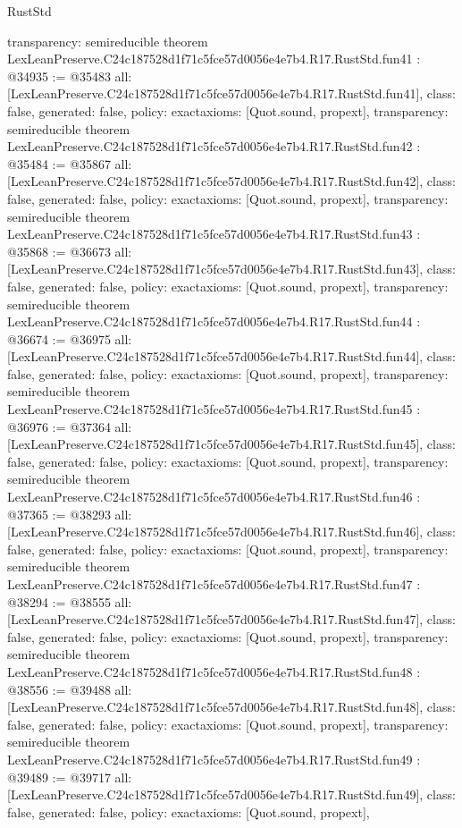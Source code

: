 \begin{lexlean}{RustStd}
\begin{coremodule}
{  transparency: semireducible
}
theorem LexLeanPreserve.C24c187528d1f71c5fce57d0056e4e7b4.R17.RustStd.fun41 : @34935 := @35483 {
  all: [LexLeanPreserve.C24c187528d1f71c5fce57d0056e4e7b4.R17.RustStd.fun41],
  class: false,
  generated: false,
  policy: exact{axioms: [Quot.sound, propext]},
  transparency: semireducible
}
theorem LexLeanPreserve.C24c187528d1f71c5fce57d0056e4e7b4.R17.RustStd.fun42 : @35484 := @35867 {
  all: [LexLeanPreserve.C24c187528d1f71c5fce57d0056e4e7b4.R17.RustStd.fun42],
  class: false,
  generated: false,
  policy: exact{axioms: [Quot.sound, propext]},
  transparency: semireducible
}
theorem LexLeanPreserve.C24c187528d1f71c5fce57d0056e4e7b4.R17.RustStd.fun43 : @35868 := @36673 {
  all: [LexLeanPreserve.C24c187528d1f71c5fce57d0056e4e7b4.R17.RustStd.fun43],
  class: false,
  generated: false,
  policy: exact{axioms: [Quot.sound, propext]},
  transparency: semireducible
}
theorem LexLeanPreserve.C24c187528d1f71c5fce57d0056e4e7b4.R17.RustStd.fun44 : @36674 := @36975 {
  all: [LexLeanPreserve.C24c187528d1f71c5fce57d0056e4e7b4.R17.RustStd.fun44],
  class: false,
  generated: false,
  policy: exact{axioms: [Quot.sound, propext]},
  transparency: semireducible
}
theorem LexLeanPreserve.C24c187528d1f71c5fce57d0056e4e7b4.R17.RustStd.fun45 : @36976 := @37364 {
  all: [LexLeanPreserve.C24c187528d1f71c5fce57d0056e4e7b4.R17.RustStd.fun45],
  class: false,
  generated: false,
  policy: exact{axioms: [Quot.sound, propext]},
  transparency: semireducible
}
theorem LexLeanPreserve.C24c187528d1f71c5fce57d0056e4e7b4.R17.RustStd.fun46 : @37365 := @38293 {
  all: [LexLeanPreserve.C24c187528d1f71c5fce57d0056e4e7b4.R17.RustStd.fun46],
  class: false,
  generated: false,
  policy: exact{axioms: [Quot.sound, propext]},
  transparency: semireducible
}
theorem LexLeanPreserve.C24c187528d1f71c5fce57d0056e4e7b4.R17.RustStd.fun47 : @38294 := @38555 {
  all: [LexLeanPreserve.C24c187528d1f71c5fce57d0056e4e7b4.R17.RustStd.fun47],
  class: false,
  generated: false,
  policy: exact{axioms: [Quot.sound, propext]},
  transparency: semireducible
}
theorem LexLeanPreserve.C24c187528d1f71c5fce57d0056e4e7b4.R17.RustStd.fun48 : @38556 := @39488 {
  all: [LexLeanPreserve.C24c187528d1f71c5fce57d0056e4e7b4.R17.RustStd.fun48],
  class: false,
  generated: false,
  policy: exact{axioms: [Quot.sound, propext]},
  transparency: semireducible
}
theorem LexLeanPreserve.C24c187528d1f71c5fce57d0056e4e7b4.R17.RustStd.fun49 : @39489 := @39717 {
  all: [LexLeanPreserve.C24c187528d1f71c5fce57d0056e4e7b4.R17.RustStd.fun49],
  class: false,
  generated: false,
  policy: exact{axioms: [Quot.sound, propext]},
}
\end{coremodule}
\end{lexlean}
